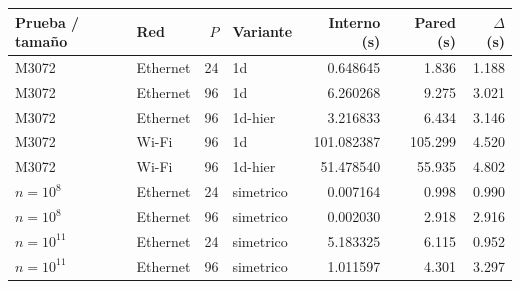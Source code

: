 \begin{center}\small
\begin{tabular}{llrlrrr}
\toprule
Prueba / tamaño & Red & $P$ & Variante & Interno (s) & Pared (s) & $\Delta$ (s) \\
\midrule
M3072 & Ethernet & 24 & 1d & 0.648645 & 1.836 & 1.188 \\
M3072 & Ethernet & 96 & 1d & 6.260268 & 9.275 & 3.021 \\
M3072 & Ethernet & 96 & 1d-hier & 3.216833 & 6.434 & 3.146 \\
M3072 & Wi-Fi & 96 & 1d & 101.082387 & 105.299 & 4.520 \\
M3072 & Wi-Fi & 96 & 1d-hier & 51.478540 & 55.935 & 4.802 \\
$n=10^8$ & Ethernet & 24 & simetrico & 0.007164 & 0.998 & 0.990 \\
$n=10^8$ & Ethernet & 96 & simetrico & 0.002030 & 2.918 & 2.916 \\
$n=10^{11}$ & Ethernet & 24 & simetrico & 5.183325 & 6.115 & 0.952 \\
$n=10^{11}$ & Ethernet & 96 & simetrico & 1.011597 & 4.301 & 3.297 \\
\bottomrule
\end{tabular}
\end{center}

